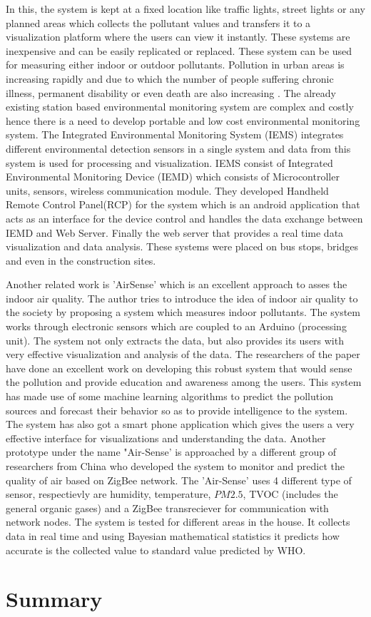  In this, the system is kept at a fixed location like traffic lights, street lights or any planned areas \cite{Pavani2017} which collects the pollutant values and transfers it to a visualization platform where the users can view it instantly. These systems are inexpensive and can be easily replicated or replaced. These system can be used for measuring either indoor or outdoor pollutants. Pollution in urban areas is increasing rapidly and due to which the number of people suffering chronic illness, permanent disability or even death are also increasing \cite{Wong2014}. The already existing station based environmental monitoring system are complex and costly hence there is a need to develop portable and low cost environmental monitoring system. The Integrated Environmental Monitoring System (IEMS)\cite{Wong2014} integrates different environmental detection sensors in a single  system and data from this system is used for processing and visualization. IEMS consist of Integrated Environmental Monitoring Device (IEMD) which consists of Microcontroller units, sensors, wireless communication module. They developed Handheld Remote Control Panel(RCP) for the system which is an android application that acts as an interface for the device control and handles the data exchange between IEMD and Web Server. Finally the web server that provides a real time data visualization and data analysis. These systems were placed on bus stops, bridges and even in the construction sites.

Another related work is 'AirSense'\cite{Fang2016} which is an excellent approach to asses the indoor air quality. The author tries to introduce the idea of indoor air quality to the society by proposing a system which measures indoor pollutants. The system works through electronic sensors which are coupled to an Arduino (processing unit). The system not only extracts the data, but also provides its users with very effective visualization and analysis of the data. The researchers of the paper have done an excellent work on developing this robust system that would sense the pollution and provide education and awareness among the users. This system has made use of some machine learning algorithms to predict the pollution sources and forecast their behavior so as to provide intelligence to the system. 
The system has also got a smart phone application which gives the users a very effective interface for visualizations and understanding the data.
Another prototype under the name "Air-Sense' \cite{Liu2017} is approached by a different group of researchers from China who developed the system to monitor and predict the quality of air based on ZigBee network. The 'Air-Sense' uses 4 different type of sensor, respectievly are humidity, temperature, $PM2.5$, TVOC (includes the general organic gases) and a ZigBee transreciever for communication with network nodes. The system is tested for different areas in the house. It collects data in real time and using Bayesian mathematical statistics it predicts how accurate is the collected value to standard value predicted by WHO. 


 \section{Summary}
